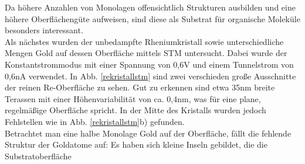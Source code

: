 Da höhere Anzahlen von Monolagen offensichtlich Strukturen ausbilden und eine höhere Oberflächengüte
aufweisen, sind diese als Substrat für organische Moleküle besonders interessant. 
\\
Als nächstes wurden der unbedampfte Rheniumkristall sowie unterschiedliche Mengen Gold auf dessen
Oberfläche mittels STM untersucht. Dabei wurde der Konstantstrommodus mit einer Spannung von 0,6V
und einem Tunnelstrom von 0,6nA verwendet. In Abb. \ref{rekristallstm} sind zwei verschieden große
Ausschnitte der reinen Re-Oberfläche zu sehen. Gut zu erkennen sind etwa 35nm breite Terassen mit
einer Höhenvariabilität von ca. 0,4nm, was für eine plane, regelmäßige Oberfläche spricht. 
In der
Mitte des Kristalls wurden jedoch Fehlstellen wie in Abb. \ref{rekristallstm}b) gefunden.\\
Betrachtet man eine halbe Monolage Gold auf der Oberfläche, fällt die fehlende Struktur der
Goldatome auf: Es haben sich kleine Inseln gebildet, die die Substratoberfläche 


